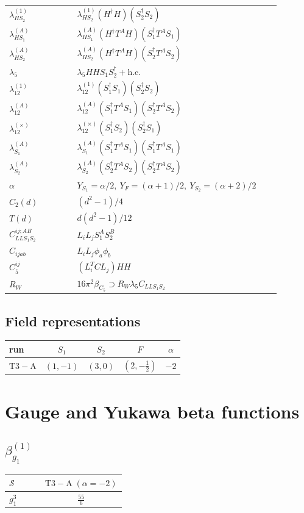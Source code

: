 \documentclass[9pt]{article}
\begin{document}
\begin{longtable}{@{}p{0.23\linewidth}p{0.69\linewidth}@{}}
$\lambda_{HS_2}^{(1)}$ & $\lambda_{HS_2}^{(1)}(H^\dagger H)(S_2^\dagger S_2)$ \\
$\lambda_{HS_1}^{(A)}$ & $\lambda_{HS_1}^{(A)}(H^\dagger T^AH)(S_1^\dagger T^AS_1)$ \\
$\lambda_{HS_2}^{(A)}$ & $\lambda_{HS_2}^{(A)}(H^\dagger T^AH)(S_2^\dagger T^AS_2)$ \\
$\lambda_5$ & $\lambda_5HHS_1S_2^\dagger+\mathrm{h.c.}$ \\
$\lambda_{12}^{(1)}$ & $\lambda_{12}^{(1)}(S_1^\dagger S_1)(S_2^\dagger S_2)$ \\
$\lambda_{12}^{(A)}$ & $\lambda_{12}^{(A)}(S_1^\dagger T^AS_1)(S_2^\dagger T^AS_2)$ \\
$\lambda_{12}^{(\times)}$ & $\lambda_{12}^{(\times)}(S_1^\dagger S_2)(S_2^\dagger S_1)$ \\
$\lambda_{S_1}^{(A)}$ & $\lambda_{S_1}^{(A)}(S_1^\dagger T^A S_1)(S_1^\dagger T^A S_1)$ \\
$\lambda_{S_2}^{(A)}$ & $\lambda_{S_2}^{(A)}(S_2^\dagger T^A S_2)(S_2^\dagger T^A S_2)$ \\
$\alpha$ & $Y_{S_1}=\alpha/2,\ Y_F=(\alpha+1)/2,\ Y_{S_2}=(\alpha+2)/2$ \\
$C_2(d)$ & $(d^2-1)/4$ \\
$T(d)$ & $d(d^2-1)/12$ \\
$C_{LLS_1S_2}^{ij;AB}$ & $L_iL_jS_1^AS_2^B$ \\
$C_{ijab}$ & $L_iL_j\phi_a\phi_b$ \\
$C_5^{ij}$ & $(L_i^TCL_j)HH$ \\
$R_W$ & $16\pi^2\beta_{C_5}\supset R_W\lambda_5C_{LLS_1S_2}$ \\
\bottomrule
\end{longtable}
\subsection*{Field representations}
\begin{longtable}{@{}lcccc@{}}
\toprule
run & $S_1$ & $S_2$ & $F$ & $\alpha$ \\
\midrule
$\mathrm{T3-A}$ & $(1,-1)$ & $(3,0)$ & $(2,- \frac{1}{2})$ & $-2$ \\
\bottomrule
\end{longtable}
\section*{Gauge and Yukawa beta functions}
\subsection*{$ \beta_{g_1}^{(1)} $}
\begin{longtable}{@{}p{0.38\linewidth}c@{}}
\toprule
$\mathcal{S}$ & $ \mathrm{T3-A}\;(\alpha=-2) $ \\
\midrule
$ g_1^3 $ & $ \frac{55}{6} $ \\
\bottomrule
\end{longtable}
\end{document}

